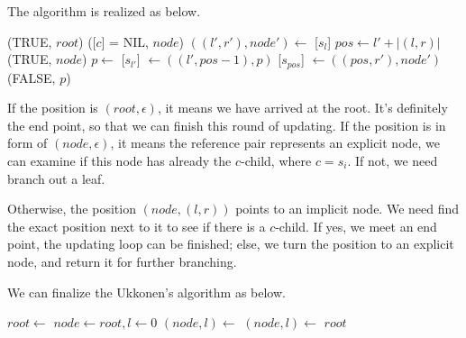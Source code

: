 \documentclass{article}
\begin{document}
The  algorithm is realized as below.

\begin{algorithmic}
      \State \Return (TRUE, $root$)
    \Else
      \State \Return ([$c$] = NIL, $node$)
    \EndIf
  \Else
    \State $((l', r'), node') \gets$ [$s_l$]
    \State $pos \gets l' + |(l, r)|$
      \State \Return (TRUE, $node$)
    \Else
      \State $p \gets$ 
      \State {}[$s_{l'}$] $\gets ((l', pos-1), p)$
      \State {}[$s_{pos}$] $\gets ((pos, r'), node')$
      \State \Return (FALSE, $p$)
    \EndIf
  \EndIf
\EndFunction
\end{algorithmic}

If the position is $(root, \epsilon)$, it means we have arrived at the root.
It's definitely the end point, so that we can finish this round of updating.
If the position is in form of $(node, \epsilon)$, it means the reference pair represents
an explicit node, we can examine if this node has already the $c$-child, where $c=s_i$.
If not, we need branch out a leaf.

Otherwise, the position $(node, (l, r))$ points to an implicit node.
We need find the exact position next to it to see if there is a $c$-child.
If yes, we meet an end point, the updating loop can be finished; else, we turn
the position to an explicit node, and return it for further branching.

We can finalize the Ukkonen's algorithm as below.

\begin{algorithmic}[1]
  \State $root \gets$ 
  \State $node \gets root, l \gets 0$
    \State $(node, l) \gets $ 
    \State $(node, l) \gets $ 
  \EndFor
  \State \Return $root$
\EndFunction
\end{algorithmic}
\end{document}
